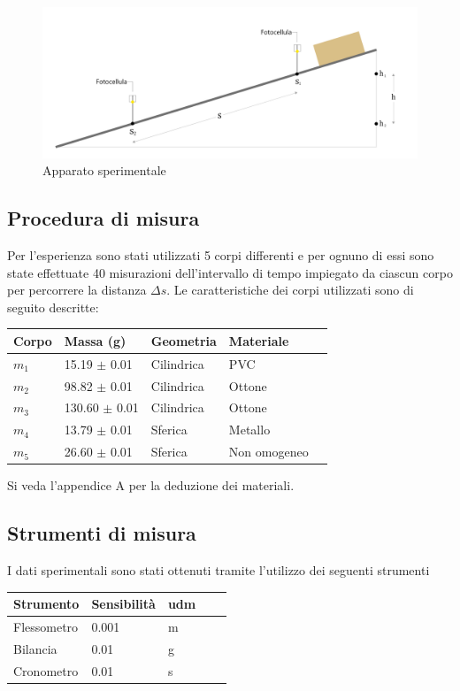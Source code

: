 \documentclass[11pt,a4paper]{article}
\begin{document}
\begin{figure}[H]
\includegraphics[scale=0.18]{experimental-setup.png}
\centering
\caption{Apparato sperimentale}
\label{fig:appspe}
\end{figure}

\subsection{Procedura di misura}
Per l'esperienza sono stati utilizzati 5 corpi differenti e per ognuno di essi sono state effettuate 40 misurazioni dell'intervallo di tempo impiegato da ciascun corpo per percorrere la distanza $\Delta s$. Le caratteristiche dei corpi utilizzati sono di seguito descritte:

\begin{longtable}[]{@{}lllll@{}}
\toprule
Corpo & Massa (g) & Geometria & Materiale\tabularnewline
\midrule
\endhead
$m_1$    & 15.19 $\pm$ 0.01 & Cilindrica & PVC\tabularnewline
$m_2$    & 98.82 $\pm$ 0.01 & Cilindrica & Ottone \tabularnewline
$m_3$    & 130.60 $\pm$ 0.01 & Cilindrica & Ottone\tabularnewline
$m_4$    & 13.79 $\pm$ 0.01 & Sferica  & Metallo \tabularnewline
$m_5$    & 26.60 $\pm$ 0.01 & Sferica  & Non omogeneo \tabularnewline
\bottomrule
\end{longtable}

Si veda l'appendice A per la deduzione dei materiali.

\subsection{Strumenti di misura}
I dati sperimentali sono stati ottenuti tramite l'utilizzo dei seguenti strumenti

\begin{longtable}[]{@{}lllll@{}}
\toprule
Strumento & Sensibilità & udm \tabularnewline
\midrule
\endhead
Flessometro & 0.001 & m \tabularnewline
Bilancia & 0.01 & g \tabularnewline
Cronometro & 0.01 & s \tabularnewline
\bottomrule
\end{longtable}
\end{document}
